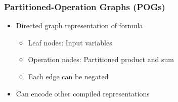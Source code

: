 \documentclass[t,pdf]{beamer}
\newcommand{\bitem}{\item[$\bullet$]}
\begin{document}
\begin{frame}
  \frametitle{Partitioned-Operation Graphs (POGs)}

\bigskip
\begin{minipage}{0.38\textwidth}
  \centering{
  
  } %
\end{minipage}
\begin{minipage}{0.6\textwidth}
\begin{itemize}
\item Directed graph representation of formula
\medskip
  \begin{itemize}
    \bitem Leaf nodes: Input variables
    \bitem Operation nodes: Partitioned product and sum
    \bitem Each edge can be negated
  \end{itemize}
\bigskip
\item 
Can encode other compiled representations
\end{itemize}
\end{minipage}

\end{frame}
\end{document}
